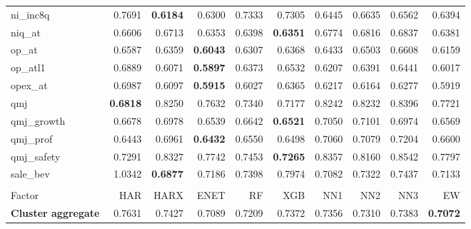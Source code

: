 \begin{longtable}{>{\raggedright\arraybackslash}p{2.6cm}rrrrrrrrr}
ni\_inc8q & 0.7691 & \textbf{\cellcolor{blue!10}0.6184} & \cellcolor{blue!10}0.6300 & \cellcolor{blue!10}0.7333 & \cellcolor{blue!10}0.7305 & \cellcolor{blue!10}0.6445 & \cellcolor{blue!10}0.6635 & \cellcolor{blue!10}0.6562 & \cellcolor{blue!10}0.6394 \\
niq\_at & 0.6606 & 0.6713 & \cellcolor{blue!10}0.6353 & \cellcolor{blue!10}0.6398 & \textbf{\cellcolor{blue!10}0.6351} & 0.6774 & 0.6816 & 0.6837 & \cellcolor{blue!10}0.6381 \\
op\_at & 0.6587 & \cellcolor{blue!10}0.6359 & \textbf{\cellcolor{blue!10}0.6043} & \cellcolor{blue!10}0.6307 & \cellcolor{blue!10}0.6368 & \cellcolor{blue!10}0.6433 & \cellcolor{blue!10}0.6503 & 0.6608 & \cellcolor{blue!10}0.6159 \\
op\_atl1 & 0.6889 & \cellcolor{blue!10}0.6071 & \textbf{\cellcolor{blue!10}0.5897} & \cellcolor{blue!10}0.6373 & \cellcolor{blue!10}0.6532 & \cellcolor{blue!10}0.6207 & \cellcolor{blue!10}0.6391 & \cellcolor{blue!10}0.6441 & \cellcolor{blue!10}0.6017 \\
opex\_at & 0.6987 & \cellcolor{blue!10}0.6097 & \textbf{\cellcolor{blue!10}0.5915} & \cellcolor{blue!10}0.6027 & \cellcolor{blue!10}0.6365 & \cellcolor{blue!10}0.6217 & \cellcolor{blue!10}0.6164 & \cellcolor{blue!10}0.6277 & \cellcolor{blue!10}0.5919 \\
qmj & \textbf{0.6818} & 0.8250 & 0.7632 & 0.7340 & 0.7177 & 0.8242 & 0.8232 & 0.8396 & 0.7721 \\
qmj\_growth & 0.6678 & 0.6978 & \cellcolor{blue!10}0.6539 & \cellcolor{blue!10}0.6642 & \textbf{\cellcolor{blue!10}0.6521} & 0.7050 & 0.7101 & 0.6974 & \cellcolor{blue!10}0.6569 \\
qmj\_prof & 0.6443 & 0.6961 & \textbf{\cellcolor{blue!10}0.6432} & 0.6550 & 0.6498 & 0.7060 & 0.7079 & 0.7204 & 0.6600 \\
qmj\_safety & 0.7291 & 0.8327 & 0.7742 & 0.7453 & \textbf{\cellcolor{blue!10}0.7265} & 0.8357 & 0.8160 & 0.8542 & 0.7797 \\
sale\_bev & 1.0342 & \textbf{\cellcolor{blue!10}0.6877} & \cellcolor{blue!10}0.7186 & \cellcolor{blue!10}0.7398 & \cellcolor{blue!10}0.7974 & \cellcolor{blue!10}0.7082 & \cellcolor{blue!10}0.7322 & \cellcolor{blue!10}0.7437 & \cellcolor{blue!10}0.7133 \\
\hline
\multicolumn{10}{@{}l}{\textit{Panel J. Seasonality}} \\
\hline
Factor & HAR & HARX & ENET & RF & XGB & NN1 & NN2 & NN3 & EW \\
\hline
\textbf{Cluster aggregate} & 0.7631 & \cellcolor{blue!10}0.7427 & \cellcolor{blue!10}0.7089 & \cellcolor{blue!10}0.7209 & \cellcolor{blue!10}0.7372 & \cellcolor{blue!10}0.7356 & \cellcolor{blue!10}0.7310 & \cellcolor{blue!10}0.7383 & \textbf{\cellcolor{blue!10}0.7072} \\

\end{longtable}
